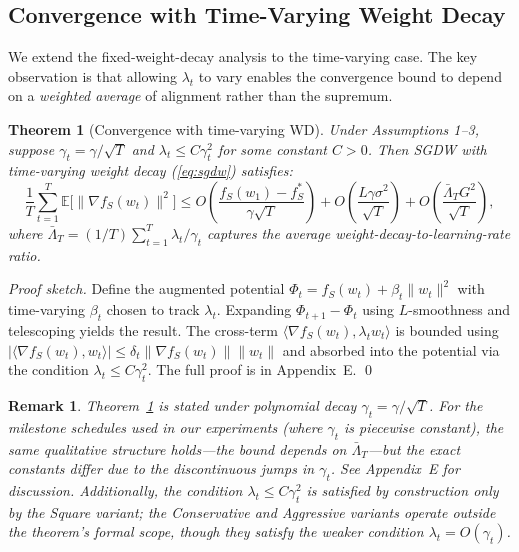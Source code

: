 \documentclass{article}
\newtheorem{theorem}{Theorem}
\newtheorem{remark}{Remark}
\begin{document}
\subsection{Convergence with Time-Varying Weight Decay}

We extend the fixed-weight-decay analysis to the time-varying case.
The key observation is that allowing $\lambda_t$ to vary enables the convergence
bound to depend on a \emph{weighted average} of alignment rather than the supremum.

\begin{theorem}[Convergence with time-varying WD]
  \label{thm:convergence}
  Under Assumptions 1--3, suppose $\gamma_t = \gamma / \sqrt{T}$ and
  $\lambda_t \leq C\gamma_t^2$ for some constant $C > 0$.
  Then SGDW with time-varying weight decay (\ref{eq:sgdw}) satisfies:
  \begin{equation}
    \frac{1}{T}\sum_{t=1}^{T} \mathbb{E}\bigl[\|\nabla f_S(w_t)\|^2\bigr]
    \leq O\!\left(\frac{f_S(w_1) - f_S^*}{\gamma\sqrt{T}}\right)
       + O\!\left(\frac{L\gamma\sigma^2}{\sqrt{T}}\right)
       + O\!\left(\frac{\bar{\Lambda}_T G^2}{\sqrt{T}}\right),
  \end{equation}
  where $\bar{\Lambda}_T = (1/T)\sum_{t=1}^{T} \lambda_t / \gamma_t$ captures the
  average weight-decay-to-learning-rate ratio.
\end{theorem}

\emph{Proof sketch.}
Define the augmented potential $\Phi_t = f_S(w_t) + \beta_t \|w_t\|^2$ with
time-varying $\beta_t$ chosen to track $\lambda_t$.
Expanding $\Phi_{t+1} - \Phi_t$ using $L$-smoothness and telescoping yields the
result.
The cross-term $\langle \nabla f_S(w_t), \lambda_t w_t \rangle$ is bounded using
$|\langle \nabla f_S(w_t), w_t \rangle| \leq \delta_t \|\nabla f_S(w_t)\| \|w_t\|$
and absorbed into the potential via the condition $\lambda_t \leq C\gamma_t^2$.
The full proof is in Appendix~E. \qed

\begin{remark}
  Theorem~\ref{thm:convergence} is stated under polynomial decay
  $\gamma_t = \gamma / \sqrt{T}$.
  For the milestone schedules used in our experiments (where $\gamma_t$ is
  piecewise constant), the same qualitative structure holds---the bound depends on
  $\bar{\Lambda}_T$---but the exact constants differ due to the discontinuous jumps
  in $\gamma_t$.
  See Appendix~E for discussion.
  Additionally, the condition $\lambda_t \leq C\gamma_t^2$ is satisfied by
  construction only by the Square variant; the Conservative and Aggressive variants
  operate outside the theorem's formal scope, though they satisfy the weaker condition
  $\lambda_t = O(\gamma_t)$.
\end{remark}
\end{document}
